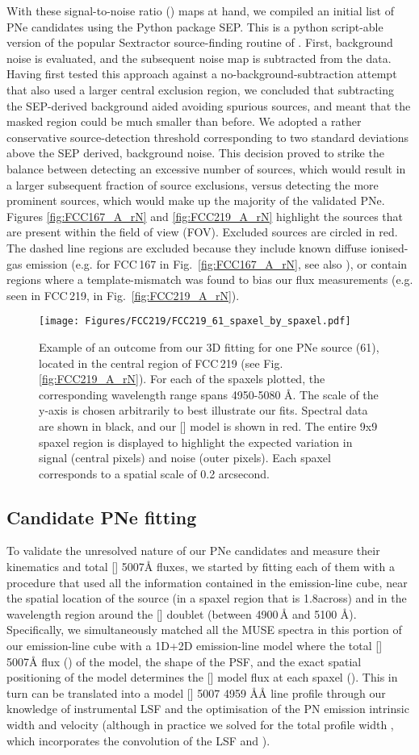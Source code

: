 \documentclass{aa}
\newcommand{\placefigthree}{
\begin{figure*}
    \centering
    \texttt{[image: Figures/FCC219/FCC219\_61\_spaxel\_by\_spaxel.pdf]}
    \caption{Example of an outcome from our 3D fitting for one PNe source (61), located in the central region of FCC\,219 (see Fig. \ref{fig:FCC219_A_rN}). For each of the  spaxels plotted, the corresponding wavelength range spans 4950-5080 \AA. The scale of the y-axis is chosen arbitrarily to best illustrate our fits. Spectral data are shown in black, and our [\ion{O}{iii}] model is shown in red. The entire 9x9 spaxel region is displayed to highlight the expected variation in signal (central pixels) and noise (outer pixels). Each spaxel corresponds to a spatial scale of 0.2 arcsecond.}
    \label{fig:FCC219_spaxel_by_spaxel}
\end{figure*}
}
\begin{document}
With these signal-to-noise ratio () maps at hand, we compiled an initial list of PNe candidates using the Python package SEP. This is a python script-able version of the popular Sextractor source-finding routine of \cite{bertin_sextractor_1996}. First, background noise is evaluated, and the subsequent noise map is subtracted from the  data. Having first tested this approach against a no-background-subtraction attempt that also used a larger central exclusion region, we concluded that subtracting the SEP-derived background aided avoiding spurious sources, and meant that the masked region could be much smaller than before. 
We adopted a rather conservative source-detection threshold corresponding to two standard deviations above the SEP derived, background noise. This decision proved to strike the balance between detecting an excessive number of sources, which would result in a larger subsequent fraction of source exclusions, versus detecting the more prominent sources, which would make up the majority of the validated PNe. Figures \ref{fig:FCC167_A_rN} and \ref{fig:FCC219_A_rN} highlight the sources that are present within the field of view (FOV). Excluded sources are circled in red. The dashed line regions are excluded because they include known diffuse ionised-gas emission (e.g. for FCC\,167 in Fig.~\ref{fig:FCC167_A_rN}, see also \citealp{viaene_fornax_2019}), or contain regions where a template-mismatch was found to bias our flux measurements (e.g. seen in FCC\,219, in Fig.~\ref{fig:FCC219_A_rN}).


\placefigthree

\subsection{Candidate PNe fitting}
To validate the unresolved nature of our PNe candidates and measure their kinematics and total [] 5007\AA{} fluxes, we started by fitting each of them with a procedure that used all the information contained in the emission-line cube, near the spatial location of the source (in a  spaxel region that is 1.8\arcsec across) and in the wavelength region around the [] doublet (between 4900\,\AA{} and 5100 \AA). Specifically, we simultaneously matched all the MUSE spectra in this portion of our emission-line cube with a 1D+2D emission-line model where the total [] 5007\AA{} flux () of the model, the shape of the PSF, and the exact spatial positioning of the model determines the [] model flux at each spaxel (). This in turn can be translated into a model [] 5007 4959 \AA\AA{} line profile through our knowledge of instrumental LSF and the optimisation of the PN emission intrinsic width  and velocity  (although in practice we solved for the total profile width , which incorporates the convolution of the LSF and ).
\end{document}
